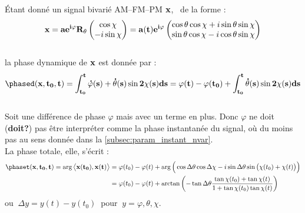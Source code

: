 \begin{proposition}\label{prop:phased/t_2var}
	\'Etant donné un signal bivarié AM--FM--PM $\bf{x}$, \ie~de la forme :
	\begin{equation}\label{eq:exp_elliptik_2var}
		\bf{x} = ae^{i\varphi} R_{\theta} \begin{pmatrix} \cos\chi \\ -i\sin\chi \end{pmatrix} 
			= a(t)e^{i\varphi} \begin{pmatrix} \cos\theta \cos\chi + i\sin\theta \sin\chi \\ \sin\theta \cos\chi - i\cos\theta \sin\chi \end{pmatrix}
	\end{equation}
	\\
	la phase dynamique de $\bf{x}$ est donnée par :
	\begin{equation}\label{eq:phased_2var}
		\phased(\bf{x}, t_0,t) = \int_{t_0}^t \dot{\varphi}(s) + \dot{\theta}(s) \sin2\chi(s) ds = \varphi(t) -\varphi(t_0) + \int_{t_0}^t\dot{\theta}(s) \sin2\chi(s) ds
	\end{equation}
	\\
	Soit une différence de phase $\varphi$ mais avec un terme en plus. Donc $\varphi$ ne doit (\textbf{doit?}) pas être interpréter comme la phase instantanée du signal, où du moins pas au sens donnée dans la \cref{subsec:param_instant_nvar}.
	\\
	La phase totale, elle, s'écrit :
	\begin{equation}\label{eq:phaset_2var}
		\begin{aligned}
			\phaset(\bf{x},t_0,t) = \arg\big\langle \bf{x}(t_0), \bf{x}(t)\big\rangle &= \varphi(t_0)-\varphi(t) + \arg\Big(\cos\Delta\theta \cos\Delta\chi - i\sin\Delta\theta \sin\big(\chi(t_0)+\chi(t)\big)\Big) \\
			&= \varphi(t_0)-\varphi(t) + \arctan\left(-\tan\Delta\theta \frac{ \tan\chi(t_0)+\tan\chi(t)}{1 + \tan\chi(t_0)\tan\chi(t)}\right)
		\end{aligned}
	\end{equation}
	ou $\ \Delta y = y(t) - y(t_0)\ $ pour $\ y=\varphi,\theta,\chi$.
\end{proposition}
